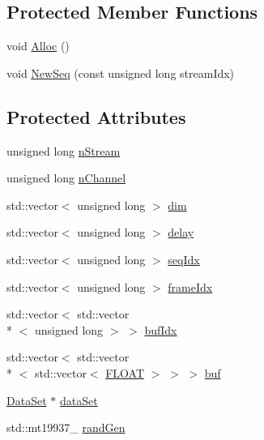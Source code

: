 \subsection*{Protected Member Functions}
\begin{DoxyCompactItemize}
\item 
void \hyperlink{classfractal_1_1DataStream_adce5798d1aee0a41699ab115f9637bd4}{Alloc} ()
\item 
void \hyperlink{classfractal_1_1DataStream_aedc5d6e1ac88b56eb720ed6fa3c2cd88}{New\+Seq} (const unsigned long stream\+Idx)
\end{DoxyCompactItemize}
\subsection*{Protected Attributes}
\begin{DoxyCompactItemize}
\item 
unsigned long \hyperlink{classfractal_1_1DataStream_aad7f2cba4a0f2fde83daa29465f81d13}{n\+Stream}
\item 
unsigned long \hyperlink{classfractal_1_1DataStream_a5af9425ea6fd0951e8354bba788c0b44}{n\+Channel}
\item 
std\+::vector$<$ unsigned long $>$ \hyperlink{classfractal_1_1DataStream_a067bd83ca8fc147bc86c925fc8251a07}{dim}
\item 
std\+::vector$<$ unsigned long $>$ \hyperlink{classfractal_1_1DataStream_aee0c7dd8635f71a1e1de54a420894b59}{delay}
\item 
std\+::vector$<$ unsigned long $>$ \hyperlink{classfractal_1_1DataStream_acecf5629e8c466ef8dc7b4570decb247}{seq\+Idx}
\item 
std\+::vector$<$ unsigned long $>$ \hyperlink{classfractal_1_1DataStream_a9e9a2c8d0f4aa79b44b78eda8ad9e58e}{frame\+Idx}
\item 
std\+::vector$<$ std\+::vector\\*
$<$ unsigned long $>$ $>$ \hyperlink{classfractal_1_1DataStream_aee8dc86b4b1f78b3ff93e3fb5bb7d009}{buf\+Idx}
\item 
std\+::vector$<$ std\+::vector\\*
$<$ std\+::vector$<$ \hyperlink{namespacefractal_a1c2d2530689575d5ccb56bae52af70d3}{F\+L\+O\+A\+T} $>$ $>$ $>$ \hyperlink{classfractal_1_1DataStream_aa606d09cd8ee4dc947ee5422b1d69921}{buf}
\item 
\hyperlink{classfractal_1_1DataSet}{Data\+Set} $\ast$ \hyperlink{classfractal_1_1DataStream_a839fc0232b60bc2f7c156370d0e6f9db}{data\+Set}
\item 
std\+::mt19937\+\_ \hyperlink{classfractal_1_1DataStream_a31caefa3fd9d99bbe0b8a19191687b53}{rand\+Gen}
\end{DoxyCompactItemize}


